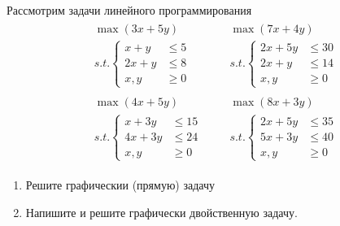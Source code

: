 
\begin{exercise}
Рассмотрим задачи линейного программирования
\begin{align*}
	& \begin{gathered}
		\max(3x+5y) \\
		s.t.\left\{\begin{aligned}
			x+y &\leqslant5 \\ 2x+y &\leqslant8 \\ x,y&\geqslant0
		\end{aligned}\right.
	\end{gathered} &
	& \begin{gathered}
		\max(7x+4y) \\
		s.t.\left\{\begin{aligned}
			2x+5y &\leqslant30 \\ 2x+y &\leqslant14 \\ x,y&\geqslant0
		\end{aligned}\right.
	\end{gathered} \\
	& \begin{gathered}
		\max(4x+5y) \\
		s.t.\left\{\begin{aligned}
			x+3y &\leqslant15 \\ 4x+3y &\leqslant24 \\ x,y&\geqslant0
		\end{aligned}\right.
	\end{gathered} &
	& \begin{gathered}
		\max(8x+3y) \\
		s.t.\left\{\begin{aligned}
			2x+5y &\leqslant35 \\ 5x+3y &\leqslant40 \\ x,y&\geqslant0
		\end{aligned}\right.
	\end{gathered}
\end{align*}
\begin{enumerate} 
	\item Решите графическии (прямую) задачу
	\item Напишите и решите графически двойственную задачу.
\end{enumerate}
\end{exercise}

